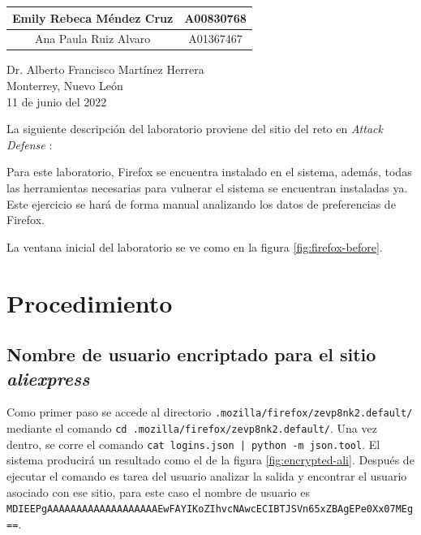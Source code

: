 \documentclass{article}
\begin{document}
\begin{titlepage}
\begin{center}
\begin{table}[h!]
\begin{tabular}{ ||c|c|| }
                    \hline
                    Emily Rebeca Méndez Cruz & A00830768 \\
                    \hline
                    Ana Paula Ruiz Alvaro & A01367467 \\
                    \hline
                \end{tabular}
            \end{table}
            \vspace{0.7cm}
            \large Dr. Alberto Francisco Martínez Herrera \\ %
            \vspace{0.2cm}
            \large Monterrey, Nuevo León \\
            \vspace{0.2cm}
            \large 11 de junio del 2022 \\
            \vspace{1cm}
        \end{center}
    \end{titlepage}

    La siguiente descripción del laboratorio proviene del sitio del reto en \emph{Attack Defense} \cite{attack-defense-no-date}:

    \begin{displayquote}
        Para este laboratorio, Firefox se encuentra instalado en el sistema, además, todas las herramientas necesarias para vulnerar el sistema se encuentran instaladas ya. Este ejercicio se hará de forma manual analizando los datos de preferencias de Firefox.        
    \end{displayquote}

    La ventana inicial del laboratorio se ve como en la figura \ref{fig:firefox-before}.

    \section{Procedimiento}

        \subsection{Nombre de usuario encriptado para el sitio \emph{aliexpress}}

            Como primer paso se accede al directorio \texttt{.mozilla/firefox/zevp8nk2.default/} mediante el comando \texttt{cd .mozilla/firefox/zevp8nk2.default/}. Una vez dentro, se corre el comando \texttt{cat logins.json | python -m json.tool}. El sistema producirá un resultado como el de la figura \ref{fig:encrypted-ali}. Después de ejecutar el comando es tarea del usuario analizar la salida y encontrar el usuario asociado con ese sitio, para este caso el nombre de usuario es \texttt{MDIEEPgAAAAAAAAAAAAAAAAAAAEwFAYIKoZIhvcNAwcECIBTJSVn65xZBAgEPe0Xx07MEg==}.
        
\end{document}
